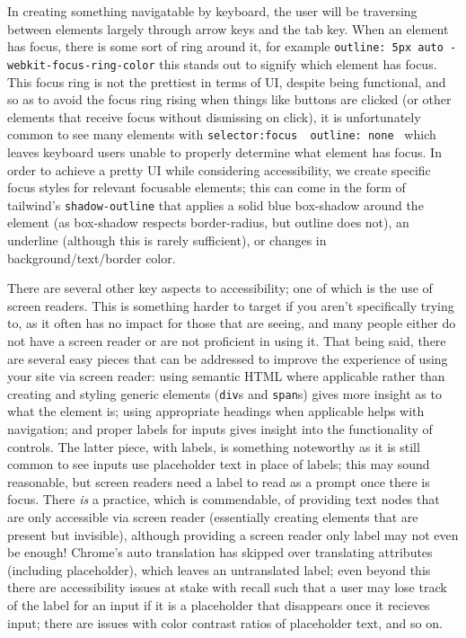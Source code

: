 \documentclass[11pt, twoside, reqno]{book}
\begin{document}
In creating something navigatable by keyboard, the user will be traversing between elements largely through arrow keys and the tab key. When an element has focus, there is some sort of ring around it, for example \texttt{outline: 5px auto -webkit-focus-ring-color} this stands out to signify which element has focus. This focus ring is not the prettiest in terms of UI, despite being functional, and so as to avoid the focus ring rising when things like buttons are clicked (or other elements that receive focus without dismissing on click), it is unfortunately common to see many elements with \texttt{selector:focus { outline: none }} which leaves keyboard users unable to properly determine what element has focus. In order to achieve a pretty UI while considering accessibility, we create specific focus styles for relevant focusable elements; this can come in the form of tailwind's \texttt{shadow-outline} that applies a solid blue box-shadow around the element (as box-shadow respects border-radius, but outline does not), an underline (although this is rarely sufficient), or changes in background/text/border color.

There are several other key aspects to accessibility; one of which is the use of screen readers. This is something harder to target if you aren't specifically trying to, as it often has no impact for those that are seeing, and many people either do not have a screen reader or are not proficient in using it. That being said, there are several easy pieces that can be addressed to improve the experience of using your site via screen reader: using semantic HTML where applicable rather than creating and styling generic elements (\texttt{div}s and \texttt{span}s) gives more insight as to what the element is; using appropriate headings when applicable helps with navigation; and proper labels for inputs gives insight into the functionality of controls. The latter piece, with labels, is something noteworthy as it is still common to see inputs use placeholder text in place of labels; this may sound reasonable, but screen readers need a label to read as a prompt once there is focus. There \textit{is} a practice, which is commendable, of providing text nodes that are only accessible via screen reader (essentially creating elements that are present but invisible), although providing a screen reader only label may not even be enough! Chrome's auto translation has skipped over translating attributes (including placeholder), which leaves an untranslated label; even beyond this there are accessibility issues at stake with recall such that a user may lose track of the label for an input if it is a placeholder that disappears once it recieves input; there are issues with color contrast ratios of placeholder text, and so on.
\end{document}
